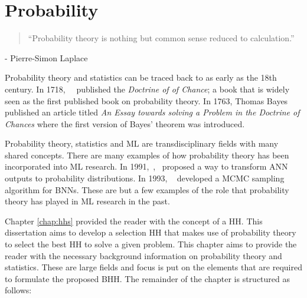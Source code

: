 \chapter{Probability}
\label{chap:probability}

\begin{quotation}
      ``Probability theory is nothing but common sense reduced to calculation.''
\end{quotation}
\begin{flushright}
      - Pierre-Simon Laplace
\end{flushright}

Probability theory and statistics can be traced back to as early as the 18th century. In 1718,~\citeauthor{ref:demoivre:1718}~\cite{ref:demoivre:1718} published the \textit{Doctrine of of Chance}; a book that is widely seen as the first published book on probability theory. In 1763, Thomas Bayes~\cite{ref:bayes:1763} published an article titled \textit{An Essay towards solving a Problem in the Doctrine of Chances} where the first version of Bayes' theorem was introduced.

Probability theory, statistics and \acf{ML} are transdisciplinary fields with many shared concepts. There are many examples of how probability theory has been incorporated into \acs{ML} research. In 1991,~\citeauthor{ref:denker:1991},~\cite{ref:denker:1991} proposed a way to transform \acf{ANN} outputs to probability distributions. In 1993, \citeauthor{ref:neal:1993}~\cite{ref:neal:1993} developed a \acf{MCMC} sampling algorithm for \acfp{BNN}. These are but a few examples of the role that probability theory has played in \acs{ML} research in the past.

Chapter \ref{chap:hhs} provided the reader with the concept of a \acf{HH}. This dissertation aims to develop a selection \acs{HH} that makes use of probability theory to select the best \acs{HH} to solve a given problem. This chapter aims to provide the reader with the necessary background information on probability theory and statistics. These are large fields and focus is put on the elements that are required to formulate the proposed \acf{BHH}. The remainder of the chapter is structured as follows:

